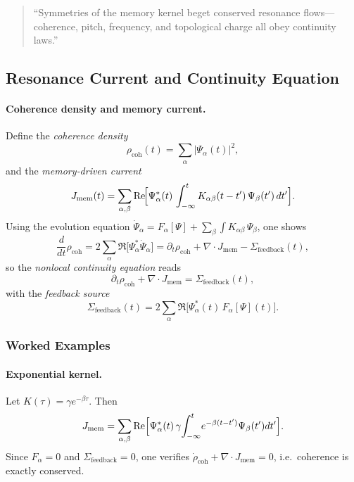 \begin{quote}
“Symmetries of the memory kernel beget conserved resonance flows—coherence, pitch, frequency, and topological charge all obey continuity laws.”  
\end{quote}

\subsection{Resonance Current and Continuity Equation}

\paragraph{Coherence density and memory current.}  
Define the \emph{coherence density}
\[
  \rho_{\mathrm{coh}}(t)
  = \sum_{\alpha} \bigl|\Psi_{\alpha}(t)\bigr|^{2},
\]
and the \emph{memory‐driven current}
\[
  J_{\mathrm{mem}}(t)
  = \sum_{\alpha,\beta}
    \Re\!\Bigl[\Psi_{\alpha}^{*}(t)\,
      \int_{-\infty}^{t}
        K_{\alpha\beta}(t - t')\,\Psi_{\beta}(t')
      \,dt'\Bigr].
\]
Using the evolution equation
\(\dot\Psi_{\alpha}=F_{\alpha}[\Psi]+\sum_{\beta}\int K_{\alpha\beta}\,\Psi_{\beta}\), one shows
\[
  \frac{d}{dt}\rho_{\mathrm{coh}}
  = 2\sum_{\alpha}\Re\bigl[\Psi_{\alpha}^{*}\dot\Psi_{\alpha}\bigr]
  = \partial_{t}\rho_{\mathrm{coh}}
    + \nabla\!\cdot J_{\mathrm{mem}}
    - \Sigma_{\mathrm{feedback}}(t),
\]
so the \emph{nonlocal continuity equation} reads
\[
  \partial_{t}\rho_{\mathrm{coh}}
  + \nabla\!\cdot J_{\mathrm{mem}}
  = \Sigma_{\mathrm{feedback}}(t),
\]
with the \emph{feedback source}
\[
  \Sigma_{\mathrm{feedback}}(t)
  = 2\sum_{\alpha}\Re\!\bigl[\Psi_{\alpha}^{*}(t)\,
    F_{\alpha}[\Psi](t)\bigr].
\]

\subsubsection{Worked Examples}

\paragraph{Exponential kernel.}  
Let \(K(\tau)=\gamma e^{-\beta\tau}\).  Then
\[
  J_{\mathrm{mem}}
  = \sum_{\alpha,\beta}
    \Re\Bigl[\Psi_{\alpha}^{*}(t)\,
      \gamma\!\int_{-\infty}^{t}\!e^{-\beta(t-t')}\Psi_{\beta}(t')dt'\Bigr].
\]
Since \(F_{\alpha}=0\) and \(\Sigma_{\mathrm{feedback}}=0\), one verifies
\(\dot\rho_{\mathrm{coh}}+\nabla\cdot J_{\mathrm{mem}}=0\), i.e.\ coherence is exactly conserved.

